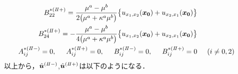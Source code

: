 \begin{align}
	\nonumber
	\\
	B_{22}^{*(I\hspace{-.15em}I+)}=\frac{\mu^{a}-\mu^{b}}{2\bigl(\mu^{a}+\kappa^{a}\mu^{b}\bigr)}
	\bigl\{u_{x_{1},x_{2}}(\bm{x_{0}})+u_{x_{2},x_{1}}(\bm{x_{0}})\bigr\}&
	\nonumber\\
	B_{24}^{*(I\hspace{-.15em}I+)}=-\frac{\mu^{a}-\mu^{b}}{4\bigl(\mu^{a}+\kappa^{a}\mu^{b}\bigr)}
	\bigl\{u_{x_{1},x_{2}}(\bm{x_{0}})+u_{x_{2},x_{1}}(\bm{x_{0}})\bigr\}&
	\nonumber
	\\
	A_{ij}^{*(I\hspace{-.15em}I-)}=0,\hspace{0.5cm}A_{ij}^{*(I\hspace{-.15em}I+)}=0,\hspace{0.5cm}
	B_{ij}^{*(I\hspace{-.15em}I-)}=0,\hspace{0.5cm}B_{ij}^{*(I\hspace{-.15em}I+)}=0&\hspace{0.5cm}(i\neq0,2)
\end{align}
以上から，$\hat{\bm{u}}^{(I\hspace{-.15em}I-)}$,$\hat{\bm{u}}^{(I\hspace{-.15em}I+)}$は以下のようになる．
